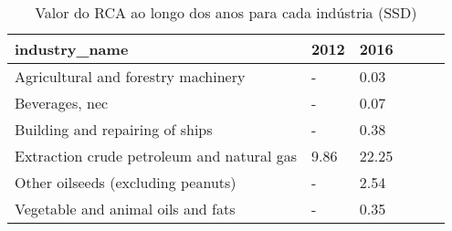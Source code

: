\begin{table}
\centering
\caption{Valor do RCA ao longo dos anos para cada indústria (SSD)}
\begin{tabular}{p{6cm}p{1.5cm}p{1.5cm}p{1.5cm}p{1.5cm}p{1.5cm}}
\toprule
                             industry\_name & 2012 &  2016 \\
\midrule
       Agricultural and forestry machinery &    - &  0.03 \\
                            Beverages, nec &    - &  0.07 \\
           Building and repairing of ships &    - &  0.38 \\
Extraction crude petroleum and natural gas & 9.86 & 22.25 \\
        Other oilseeds (excluding peanuts) &    - &  2.54 \\
        Vegetable and animal oils and fats &    - &  0.35 \\
\bottomrule
\end{tabular}
\end{table}
